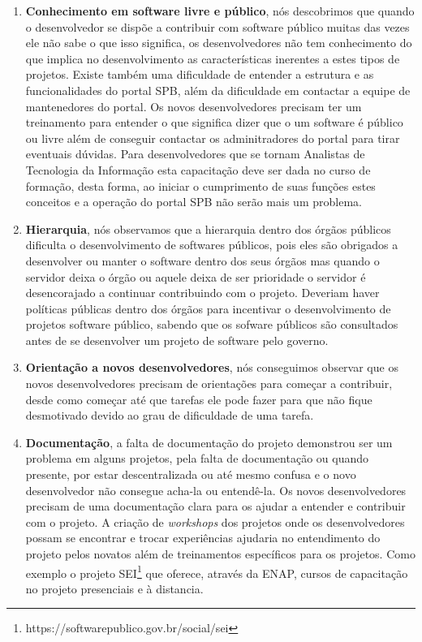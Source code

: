 \begin{enumerate}
\item \textbf{Conhecimento em software livre e público}, nós descobrimos que quando
o desenvolvedor se dispõe a contribuir com software público muitas das vezes ele
não sabe o que isso significa, os desenvolvedores não
tem conhecimento do que implica no desenvolvimento as características inerentes
a estes tipos de projetos. Existe também uma dificuldade de entender a estrutura
e as funcionalidades do portal SPB, além da dificuldade em contactar a equipe de 
mantenedores do portal. Os novos desenvolvedores precisam ter um treinamento para entender
o que significa dizer que o um software é público ou livre além de conseguir contactar os
adminitradores do portal para tirar eventuais dúvidas.
Para desenvolvedores que se tornam Analistas de Tecnologia da Informação esta 
capacitação deve ser dada no curso de formação, desta forma, ao iniciar o cumprimento
de suas funções estes conceitos e a operação do portal SPB não serão mais um problema.

\item \textbf{Hierarquia}, nós observamos que a hierarquia dentro dos órgãos públicos 
dificulta o desenvolvimento de softwares públicos, pois eles são obrigados a desenvolver
ou manter o software dentro dos seus órgãos mas quando o servidor deixa o órgão ou aquele 
deixa de ser prioridade o servidor é desencorajado a continuar contribuindo com o projeto.
Deveriam haver políticas públicas dentro dos órgãos para incentivar o desenvolvimento de 
projetos software público, sabendo que os sofware públicos são consultados antes de se
desenvolver um projeto de software pelo governo. 

\item \textbf{Orientação a novos desenvolvedores}, nós conseguimos observar que os 
novos desenvolvedores precisam de orientações para começar a contribuir, desde como
começar até que tarefas ele pode fazer para que não fique desmotivado devido ao grau
de dificuldade de uma tarefa.

\item \textbf{Documentação}, a falta de documentação do projeto demonstrou ser um
problema em alguns projetos, pela falta de documentação ou quando presente, por estar descentralizada 
ou até mesmo confusa e o novo desenvolvedor não consegue acha-la ou entendê-la. Os novos 
desenvolvedores precisam de uma documentação clara para os ajudar a entender e contribuir
com o projeto. A criação de \textit{workshops} dos projetos onde os desenvolvedores
possam se encontrar e trocar experiências ajudaria no entendimento do projeto pelos
novatos além de treinamentos específicos para os projetos. Como exemplo o projeto
SEI\footnote{https://softwarepublico.gov.br/social/sei} que oferece, através da
ENAP, cursos de capacitação no projeto presenciais e à distancia.


\end{enumerate}
